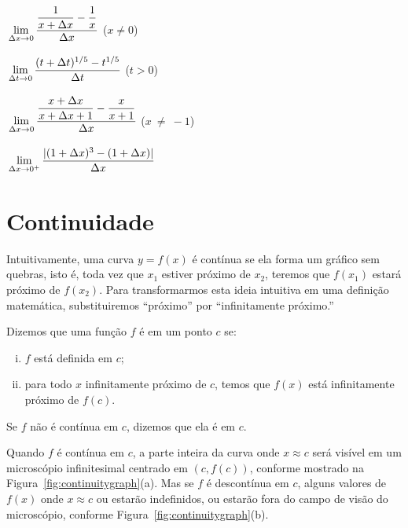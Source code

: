 \begin{sectionproblems}
%
        {$\dslim{\Dx \to 0} \dfrac{\dfrac{1}{x + \Dx}-\dfrac{1}{x}}{\Dx}$ \;
         ($x \ne 0$)}

%
        {$\dslim{\Dt \to 0} \dfrac{(t + \Dt)^{1/5} - t^{1/5}}{\Dt}$ \; ($t > 0$)}

%
        {$\dslim{\Dx \to 0} \dfrac{\dfrac{x + \Dx}{x + \Dx + 1}-\dfrac{x}{x+1}}{\Dx}$ \; ($x~\ne~-1$)}

%
        {$\dslim{\Dx \to 0^+} \dfrac{|(1+\Dx)^3-(1+\Dx)|}{\Dx}$}


\end{sectionproblems}

\section{Continuidade}
\label{sec:continuity}

Intuitivamente, uma curva $y = f(x)$ é contínua se ela forma um gráfico
sem quebras, isto é, toda vez que $x_1$ estiver próximo de $x_2$, teremos
que $f(x_1)$ estará próximo de $f(x_2)$. Para transformarmos esta ideia
intuitiva em uma definição matemática, substituiremos ``próximo'' por
``infinitamente próximo.''

\begin{definition*}
Dizemos que uma função $f$ é 
 em um ponto $c$ se:
\begin{enumerate}[(i)]
\item $f$ está definida em $c$;
\item para todo $x$ infinitamente próximo de $c$, temos que $f(x)$ está
      infinitamente próximo de $f(c)$.
\end{enumerate}
\end{definition*}

Se $f$ não é contínua em $c$, dizemos que ela é  em $c$.

Quando $f$ é contínua em $c$, a parte inteira da curva onde $x \approx c$
será visível em um microscópio infinitesimal centrado em $(c, f(c))$,
conforme mostrado na Figura~\ref{fig:continuitygraph}(a). Mas se $f$ é
descontínua em $c$, alguns valores de $f(x)$ onde $x \approx c$ ou estarão
indefinidos, ou estarão fora do campo de visão do microscópio, conforme
Figura~\ref{fig:continuitygraph}(b).

